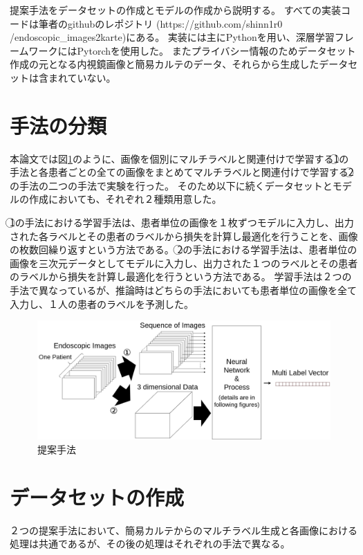 提案手法をデータセットの作成とモデルの作成から説明する。
すべての実装コードは筆者のgithubのレポジトリ (https://github.com/shinn1r0\\/endoscopic\_images2karte)にある。
実装には主にPythonを用い、深層学習フレームワークにはPytorchを使用した。
またプライバシー情報のためデータセット作成の元となる内視鏡画像と簡易カルテのデータ、それらから生成したデータセットは含まれていない。

\section{手法の分類}
本論文では図\ref{fig:methods}のように、画像を個別にマルチラベルと関連付けで学習する\textcircled{\scriptsize 1}の手法と各患者ごとの全ての画像をまとめてマルチラベルと関連付けで学習する\textcircled{\scriptsize 2}の手法の二つの手法で実験を行った。
そのため以下に続くデータセットとモデルの作成においても、それぞれ２種類用意した。

\textcircled{\scriptsize 1}の手法における学習手法は、患者単位の画像を１枚ずつモデルに入力し、出力された各ラベルとその患者のラベルから損失を計算し最適化を行うことを、画像の枚数回繰り返すという方法である。
\textcircled{\scriptsize 2}の手法における学習手法は、患者単位の画像を三次元データとしてモデルに入力し、出力された１つのラベルとその患者のラベルから損失を計算し最適化を行うという方法である。
学習手法は２つの手法で異なっているが、推論時はどちらの手法においても患者単位の画像を全て入力し、１人の患者のラベルを予測した。
\begin{figure}[htbp]
    \begin{center}
        \includegraphics[width=150mm]{./fig/ieice4.png}
        \caption{提案手法}
        \label{fig:methods}
    \end{center}
\end{figure}

\section{データセットの作成}
２つの提案手法において、簡易カルテからのマルチラベル生成と各画像における処理は共通であるが、その後の処理はそれぞれの手法で異なる。
